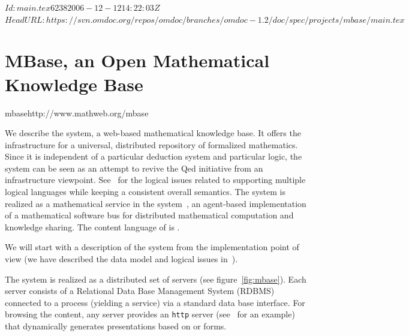 \svnInfo $Id: main.tex 6238 2006-12-12 14:22:03Z  $
\svnKeyword $HeadURL: https://svn.omdoc.org/repos/omdoc/branches/omdoc-1.2/doc/spec/projects/mbase/main.tex $

\section[MBase]{MBase, an Open Mathematical Knowledge Base}
\begin{project}{mbase}{http://www.mathweb.org/mbase}
\end{project}

We describe the {\mbase} system, a web-based mathematical knowledge base. It offers the
infrastructure for a universal, distributed repository of formalized mathematics. Since it
is independent of a particular deduction system and particular logic, the {\mbase} system
can be seen as an attempt to revive the {\sc Qed} initiative  from an infrastructure
viewpoint. See~\cite{KohFra:rkcimss01} for the logical issues related to supporting
multiple logical languages while keeping a consistent overall semantics. The system is
realized as a mathematical service in the {\mathweb}
system~\cite{FraKoh:mabdl99,ZimmerMICAI04}, an agent-based implementation of a
mathematical software bus for distributed mathematical computation and knowledge
sharing. The content language of {\mbase} is {\omdoc}.

We will start with a description of the system from the implementation point of
view (we have described the data model and logical issues
in~\cite{KohFra:rkcimss01}).  

The {\mbase} system is realized as a distributed set of {\mbase} servers (see
figure~\ref{fig:mbase}). Each {\mbase} server consists of a Relational Data Base
Management System (RDBMS) connected to a {\mozart} process (yielding a {\mathweb} service)
via a standard data base interface.  For browsing the {\mbase} content, any {\mbase}
server provides an {\tt http} server (see~\cite{MBase-Demo:URL} for an example) that
dynamically generates presentations based on {\html} or {\xml} forms.

